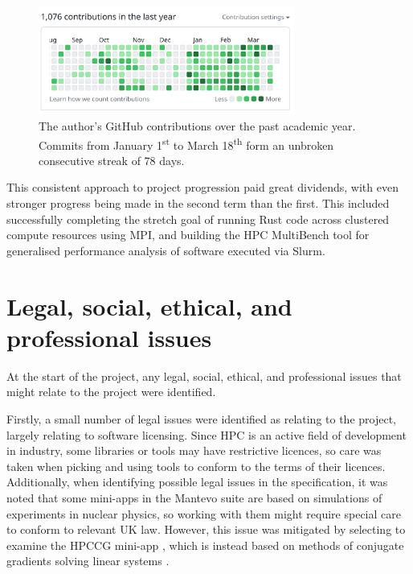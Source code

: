 \begin{figure}[H]
    \centering
    \includegraphics[width=0.75\textwidth]{images/6_project_management/github_year_long_contributions.png}
    \caption{The author's GitHub contributions over the past academic year. Commits from January 1\textsuperscript{st} to March 18\textsuperscript{th} form an unbroken consecutive streak of 78 days.}
    \label{fig:github_year_long_contributions}
\end{figure}

This consistent approach to project progression paid great dividends, with even stronger progress being made in the second term than the first. This included successfully completing the stretch goal of running Rust code across clustered compute resources using MPI, and building the HPC MultiBench tool for generalised performance analysis of software executed via Slurm.

\section{Legal, social, ethical, and professional issues}
\label{sec:legal-social-ethical-professional-issues}

At the start of the project, any legal, social, ethical, and professional issues that might relate to the project were identified. 

Firstly, a small number of legal issues were identified as relating to the project, largely relating to software licensing. Since \acrshort{HPC} is an active field of development in industry, some libraries or tools may have restrictive licences, so care was taken when picking and using tools to conform to the terms of their licences. Additionally, when identifying possible legal issues in the specification, it was noted that some \acrshort{mini-app}s in the Mantevo suite are based on simulations of experiments in nuclear physics, so working with them might require special care to conform to relevant UK law. However, this issue was mitigated by selecting to examine the \acrshort{HPCCG} \acrshort{mini-app} \cite{herouxHPCCGSolverPackage2007}, which is instead based on methods of conjugate gradients solving linear systems \cite{hestenesMethodsConjugateGradients1952}.

